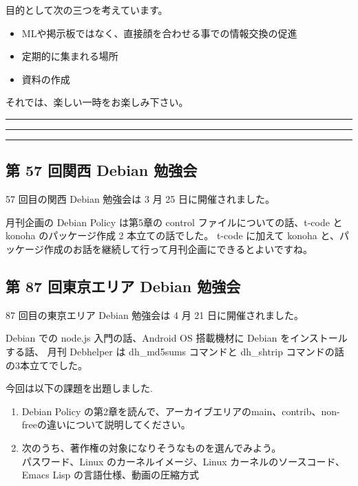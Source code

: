 \documentclass[mingoth,a4paper]{jsarticle}
\begin{document}
 目的として次の三つを考えています。
 \begin{itemize}
  \item MLや掲示板ではなく、直接顔を合わせる事での情報交換の促進
  \item 定期的に集まれる場所
  \item 資料の作成
 \end{itemize}

 それでは、楽しい一時をお楽しみ下さい。

\newpage

\begin{minipage}[b]{0.2\hsize}
 {}
\end{minipage}
\begin{minipage}[b]{0.8\hsize}
\hrule
\vspace{2mm}
\hrule
\setcounter{tocdepth}{1}
\tableofcontents
\vspace{2mm}
\hrule
\end{minipage}


\subsection{第 57 回関西 Debian 勉強会}
57 回目の関西 Debian 勉強会は 3 月 25 日に開催されました。

月刊企画の Debian Policy は第5章の control ファイルについての話、t-code と konoha のパッケージ作成 2 本立ての話でした。
t-code に加えて konoha と、パッケージ作成のお話を継続して行って月刊企画にできるとよいですね。

\subsection{第 87 回東京エリア Debian 勉強会}
87 回目の東京エリア Debian 勉強会は 4 月 21 日に開催されました。

Debian での node.js 入門の話、Android OS 搭載機材に Debian をインストールする話、
月刊 Debhelper は dh\_md5sums コマンドと dh\_shtrip コマンドの話の3本立てでした。
\clearpage


今回は以下の課題を出題しました.
\begin{screen}
  \begin{enumerate}
  \item Debian Policy の第2章を読んで、アーカイブエリアのmain、contrib、non-freeの違いについて説明してください。
  \item 次のうち、著作権の対象になりそうなものを選んでみよう。\\
パスワード、Linux のカーネルイメージ、Linux カーネルのソースコード、Emacs Lisp の言語仕様、動画の圧縮方式
  \end{enumerate}
\end{screen}
\end{document}
